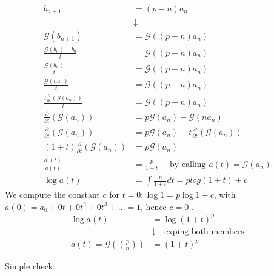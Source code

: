 \begin{displaymath}
  \begin{split}
    b_{n+1} &= (p-n)a_n \\
    &\downarrow \\
    \mathcal{G} (b_{n+1}) &= \mathcal{G} ((p-n)a_n)\\
    \frac{\mathcal{G} (b_n) - b_0}{t} &= \mathcal{G} ((p-n)a_n)\\
    \frac{\mathcal{G} (b_n)}{t} &= \mathcal{G} ((p-n)a_n)\\
    \frac{\mathcal{G} (n a_n)}{t} &= \mathcal{G} ((p-n)a_n)\\
    \frac{t\frac{\partial}{\partial t}\left( \mathcal{G} (a_n)
      \right) }{t} &= \mathcal{G} ((p-n)a_n)\\
    \frac{\partial}{\partial t}\left( \mathcal{G} (a_n) \right) &=
    p\mathcal{G} (a_n) - \mathcal{G} (n a_n)\\
    \frac{\partial}{\partial t}\left( \mathcal{G} (a_n) \right) &=
    p\mathcal{G} (a_n) - t \frac{\partial}{\partial t}\left(
      \mathcal{G} (a_n) \right)\\
    (1+t)\frac{\partial}{\partial t}\left( \mathcal{G} (a_n) \right)
    &=    p\mathcal{G} (a_n) \\
    \frac{a^\prime(t)}{a(t)} &= \frac{p}{1+t} \quad \text{ by calling
    }
    a(t) = \mathcal{G} (a_n)\\
    \log a(t) &= \int{ \frac{p}{1+t}dt} = p log{(1+t)} + c
  \end{split}
\end{displaymath}
We compute the constant $c$ for $t=0: \log 1 = p \log 1 + c$, with
$a(0) = a_0 + 0t+0t^2 + 0t^3+\ldots = 1$, hence $c=0$ .
\begin{displaymath}
  \begin{split}
    \log{a(t)} &= \log{(1+t)}^p\\
    &\downarrow \quad \text{exping both members}\\
    a(t) = \mathcal{G}\left({{p}\choose{n}}\right) &= (1+t)^p
  \end{split}
\end{displaymath}

Simple check:


